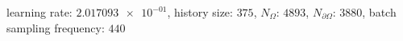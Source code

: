 learning rate: $\num[scientific-notation=true]{2.017093e-01}$, history size: $\num[scientific-notation=false]{375}$, $N_{\Omega}$: $\num[scientific-notation=false]{4893}$, $N_{\partial\Omega}$: $\num[scientific-notation=false]{3880}$, batch sampling frequency: $\num[scientific-notation=false]{440}$
